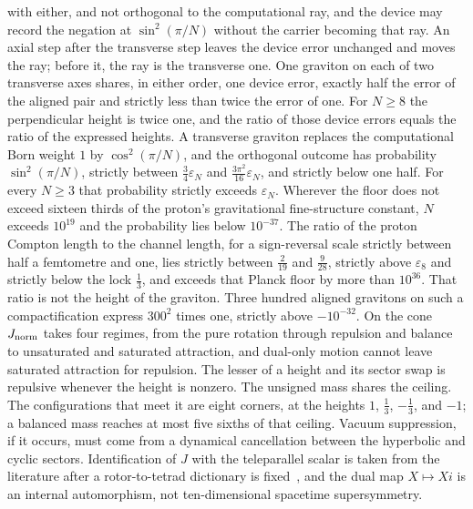 \documentclass[a4paper]{article}
\begin{document}
with either, and not orthogonal to the computational ray, and the device may record the negation at \(\sin^2(\pi/N)\) without the carrier becoming that ray. An axial step after the transverse step leaves the device error unchanged and moves the ray; before it, the ray is the transverse one. One graviton on each of two transverse axes shares, in either order, one device error, exactly half the error of the aligned pair and strictly less than twice the error of one. For \(N\ge 8\) the perpendicular height is twice one, and the ratio of those device errors equals the ratio of the expressed heights. A transverse graviton replaces the computational Born weight $1$ by $\cos^2(\pi/N)$, and the orthogonal outcome has probability $\sin^2(\pi/N)$, strictly between $\tfrac34\varepsilon_N$ and $\tfrac{3\pi^2}{16}\varepsilon_N$, and strictly below one half. For every \(N\ge 3\) that probability strictly exceeds \(\varepsilon_N\). Wherever the floor does not exceed sixteen thirds of the proton's gravitational fine-structure constant, \(N\) exceeds \(10^{19}\) and the probability lies below \(10^{-37}\). The ratio of the proton Compton length to the channel length, for a sign-reversal scale strictly between half a femtometre and one, lies strictly between \(\tfrac{2}{19}\) and \(\tfrac{9}{28}\), strictly above \(\varepsilon_8\) and strictly below the lock \(\tfrac13\), and exceeds that Planck floor by more than \(10^{36}\). That ratio is not the height of the graviton. Three hundred aligned gravitons on such a compactification express \(300^{2}\) times one, strictly above \(-10^{-32}\). On the cone \(J_{\rm norm}\) takes four regimes, from the pure rotation through repulsion and balance to unsaturated and saturated attraction, and dual-only motion cannot leave saturated attraction for repulsion. The lesser of a height and its sector swap is repulsive whenever the height is nonzero. The unsigned mass shares the ceiling. The configurations that meet it are eight corners, at the heights \(1\), \(\frac13\), \(-\frac13\), and \(-1\); a balanced mass reaches at most five sixths of that ceiling. Vacuum suppression, if it occurs, must come from a dynamical cancellation between the hyperbolic and cyclic sectors. Identification of $J$ with the teleparallel scalar is taken from the literature after a rotor-to-tetrad dictionary is fixed~\cite{maluf2013}, and the dual map $X\mapsto Xi$ is an internal automorphism, not ten-dimensional spacetime supersymmetry.
\end{document}
